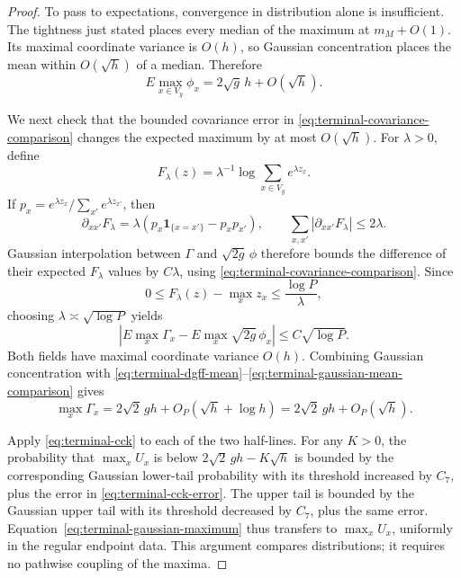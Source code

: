 \begin{proof}
To pass to expectations, convergence in distribution alone is
insufficient.  The tightness just stated places every median of the
maximum at $m_M+O(1)$.  Its maximal coordinate variance is $O(h)$,
so Gaussian concentration places the mean within $O(\sqrt h)$ of
a median.  Therefore
\begin{equation}
 E\max_{x\in V_y}\phi_x=2\sqrt g\,h+O(\sqrt h).
 \tag{75a}\label{eq:terminal-dgff-mean}
\end{equation}

We next check that the bounded covariance error in
\eqref{eq:terminal-covariance-comparison} changes the expected
maximum by at most $O(\sqrt h)$.  For $\lambda>0$, define
\[
 F_\lambda(z)=\lambda^{-1}\log\sum_{x\in V_y}e^{\lambda z_x}.
\]
If $p_x=e^{\lambda z_x}/\sum_{x'}e^{\lambda z_{x'}}$, then
\[
 \partial_{xx'}F_\lambda
 =\lambda(p_x\mathbf1_{\{x=x'\}}-p_xp_{x'}),\qquad
 \sum_{x,x'}|\partial_{xx'}F_\lambda|\le2\lambda.
\]
Gaussian interpolation between $\Gamma$ and $\sqrt{2g}\,\phi$
therefore bounds the difference of their expected $F_\lambda$
values by $C\lambda$, using
\eqref{eq:terminal-covariance-comparison}.  Since
\[
 0\le F_\lambda(z)-\max_xz_x\le\frac{\log P}{\lambda},
\]
choosing $\lambda\asymp\sqrt{\log P}$ yields
\begin{equation}
 \left|E\max_x\Gamma_x-E\max_x\sqrt{2g}\,\phi_x\right|
 \le C\sqrt{\log P}.
 \tag{76}\label{eq:terminal-gaussian-mean-comparison}
\end{equation}
Both fields have maximal coordinate variance $O(h)$.  Combining
Gaussian concentration with
\eqref{eq:terminal-dgff-mean}--\eqref{eq:terminal-gaussian-mean-comparison}
gives
\begin{equation}
 \max_x\Gamma_x=2\sqrt2\,g h+O_P(\sqrt h+\log h)
             =2\sqrt2\,g h+O_P(\sqrt h).
 \tag{77}\label{eq:terminal-gaussian-maximum}
\end{equation}

Apply \eqref{eq:terminal-cck} to each of the two half-lines.  For
any $K>0$, the probability that $\max_xU_x$ is below
$2\sqrt2\,gh-K\sqrt h$ is bounded by the corresponding Gaussian
lower-tail probability with its threshold increased by $C_7$, plus
the error in \eqref{eq:terminal-cck-error}.  The upper tail is bounded
by the Gaussian upper tail with its threshold decreased by $C_7$,
plus the same error.  Equation~\eqref{eq:terminal-gaussian-maximum}
thus transfers to $\max_xU_x$, uniformly in the regular endpoint
data.  This argument compares distributions; it requires no
pathwise coupling of the maxima.


\end{proof}
